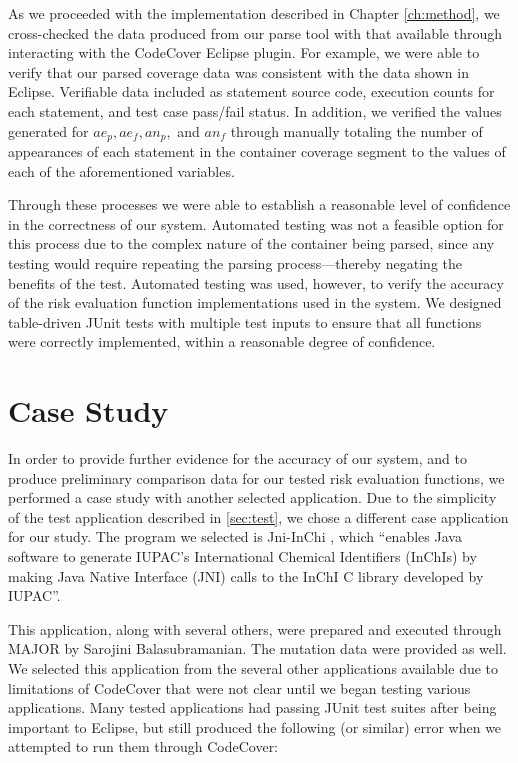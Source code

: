 As we proceeded with the implementation described in Chapter \ref{ch:method}, we cross-checked
the data produced from our parse tool with that available through interacting with the CodeCover
Eclipse plugin.  For example, we were able to verify that our parsed coverage data was consistent
with the data shown in Eclipse.  Verifiable data included as statement source code, execution 
counts for each statement, and test case pass/fail status.  In addition, we verified the values
generated for $ae_p, ae_f, an_p,$ and $an_f$ through manually totaling the number of appearances 
of each statement in the container coverage segment to the values of each of the aforementioned
variables.  

Through these processes we were able to establish a reasonable level of confidence
in the correctness of our system.  Automated testing was not a feasible option for this process
due to the complex nature of the container being parsed, since any testing would require 
repeating the parsing process---thereby negating the benefits of the test.  Automated testing
was used, however, to verify the accuracy of the risk evaluation function implementations
used in the system.  We designed table-driven JUnit tests with multiple test inputs to 
ensure that all functions were correctly implemented, within a reasonable degree of confidence.

\section{Case Study}\label{sec:case}

In order to provide further evidence for the accuracy of our system, and to produce preliminary 
comparison data for our tested risk evaluation functions, we performed a case study with another
selected application. Due to the simplicity of the test application described in \ref{sec:test}, 
we chose a different case application for our study.  The program we selected is Jni-InChi
\cite{jniinchi}, which ``enables Java software to generate IUPAC's International Chemical Identifiers 
(InChIs) by making Java Native Interface (JNI) calls to the InChI C library developed by IUPAC''.

This application, along with several others, were prepared and executed through MAJOR by Sarojini
Balasubramanian.  The mutation data were provided as well.  We selected this application from the
several other applications available due to limitations of CodeCover that were not clear until we
began testing various applications.  Many tested applications had passing JUnit test suites after
being important to Eclipse, but still produced the following (or similar) error when we attempted
to run them through CodeCover:

